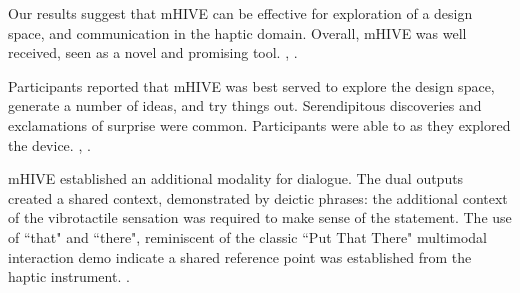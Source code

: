 
Our results suggest that mHIVE can be effective for exploration of a design space, and communication in the haptic domain. %
Overall, mHIVE was well received, seen as a novel and promising tool.
,
.


Participants reported that mHIVE was best served to explore the design space, generate a number of ideas, and try things out.
Serendipitous discoveries and exclamations of surprise were common.
Participants were able to  as they explored the device.
	,
	.





mHIVE %
established an additional modality for dialogue.
The dual outputs created a shared context, demonstrated by deictic phrases: the additional context of the vibrotactile sensation was required to make sense of the statement.
The use of ``that" and ``there", reminiscent of the classic ``Put That There" multimodal interaction demo \cite{Bolt1980} indicate a shared reference point was established from the haptic instrument.
.

